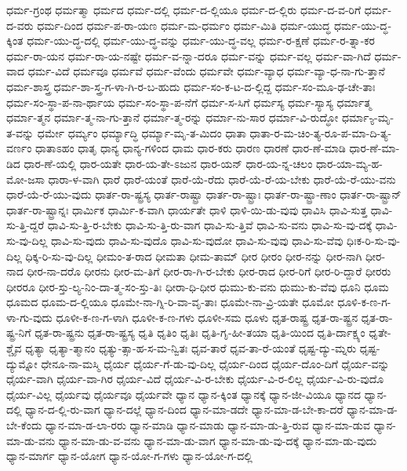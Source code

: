 {ಧರ್ಮ-ಗ್ರಂಥ
ಧರ್ಮತ್ಮಾ
ಧರ್ಮದ
ಧರ್ಮ-ದಲ್ಲಿ
ಧರ್ಮ-ದ-ಲ್ಲಿಯೂ
ಧರ್ಮ-ದ-ಲ್ಲಿರು
ಧರ್ಮ-ದ-ವ-ರಿಗೆ
ಧರ್ಮ-ದ-ವರು
ಧರ್ಮ-ದಿಂದ
ಧರ್ಮ-ಪ-ರಾ-ಯಣ
ಧರ್ಮ-ಮ-ಧರ್ಮಂ
ಧರ್ಮ-ಮಿತಿ
ಧರ್ಮ-ಯುದ್ಧ
ಧರ್ಮ-ಯು-ದ್ಧ-ಕ್ಕಿಂತ
ಧರ್ಮ-ಯು-ದ್ಧ-ದಲ್ಲಿ
ಧರ್ಮ-ಯು-ದ್ಧ-ವನ್ನು
ಧರ್ಮ-ಯು-ದ್ಧ-ವಲ್ಲ
ಧರ್ಮ-ರ-ಕ್ಷಣೆ
ಧರ್ಮ-ರ-ತ್ನಾ-ಕರ
ಧರ್ಮ-ರಾ-ಯನ
ಧರ್ಮ-ರಾ-ಯ-ನಷ್ಟೇ
ಧರ್ಮ-ವ-ನ್ನಾ-ದರೂ
ಧರ್ಮ-ವನ್ನು
ಧರ್ಮ-ವಲ್ಲ
ಧರ್ಮ-ವಾ-ಗಿದೆ
ಧರ್ಮ-ವಾದ
ಧರ್ಮ-ವಿದೆ
ಧರ್ಮವೂ
ಧರ್ಮವೆ
ಧರ್ಮ-ವೆಂದು
ಧರ್ಮವೇ
ಧರ್ಮ-ವ್ಯಾಧ
ಧರ್ಮ-ವ್ಯಾ-ಧ-ನಾ-ಗು-ತ್ತಾನೆ
ಧರ್ಮ-ಶಾಸ್ತ್ರ
ಧರ್ಮ-ಶಾ-ಸ್ತ್ರ-ಗ-ಳಾ-ಗಿ-ರ-ಬ-ಹುದು
ಧರ್ಮ-ಸಂ-ಕ-ಟ-ದ-ಲ್ಲಿದ್ದ
ಧರ್ಮ-ಸಂ-ಮೂ-ಢ-ಚೇ-ತಾಃ
ಧರ್ಮ-ಸಂ-ಸ್ಥಾ-ಪ-ನಾ-ರ್ಥಾಯ
ಧರ್ಮ-ಸಂ-ಸ್ಥಾ-ಪ-ನೆಗೆ
ಧರ್ಮ-ಸ-ಸಿಗೆ
ಧರ್ಮಸ್ಯ
ಧರ್ಮ-ಸ್ಯಾಸ್ಯ
ಧರ್ಮಾತ್ಮ
ಧರ್ಮಾ-ತ್ಮನ
ಧರ್ಮಾ-ತ್ಮ-ನಾ-ಗು-ತ್ತಾನೆ
ಧರ್ಮಾ-ತ್ಮ-ರನ್ನು
ಧರ್ಮಾ-ನು-ಸಾರ
ಧರ್ಮಾ-ವಿ-ರುದ್ಧೋ
ಧರ್ಮಾ-್ಯ-ಮೃ-ತ-ವನ್ನು
ಧರ್ಮೇ
ಧರ್ಮ್ಯಂ
ಧರ್ಮ್ಯಾದ್ಧಿ
ಧರ್ಮ್ಯಾ-ಮೃ-ತ-ಮಿದಂ
ಧಾತಾ
ಧಾತಾ-ರ-ಮ-ಚಿಂ-ತ್ಯ-ರೂ-ಪ-ಮಾ-ದಿ-ತ್ಯ-ವರ್ಣಂ
ಧಾತಾಽಹಂ
ಧಾತೃ
ಧಾನ್ಯ
ಧಾನ್ಯ-ಗಳಿಂದ
ಧಾಮ
ಧಾರ-ಕರು
ಧಾರಣ
ಧಾರಣೆ
ಧಾರ-ಣೆ-ಮಾಡಿ
ಧಾರ-ಣೆ-ಮಾ-ಡಿದ
ಧಾರ-ಣೆ-ಯಲ್ಲಿ
ಧಾರ-ಯತೇ
ಧಾರ-ಯ-ತೇ-ಽಜುನ
ಧಾರ-ಯನ್
ಧಾರ-ಯ-ನ್ನ-ಚಲಂ
ಧಾರ-ಯಾ-ಮ್ಯ-ಹ-ಮೋ-ಜಸಾ
ಧಾರಾ-ಳ-ವಾಗಿ
ಧಾರೆ
ಧಾರೆ-ಯಂತೆ
ಧಾರೆ-ಯೆ-ರೆದು
ಧಾರೆ-ಯೆ-ರೆ-ಯ-ಬೇಕು
ಧಾರೆ-ಯೆ-ರೆ-ಯು-ವನು
ಧಾರೆ-ಯೆ-ರೆ-ಯು-ವುದು
ಧಾರ್ತ-ರಾ-ಷ್ಟ್ರಸ್ಯ
ಧಾರ್ತ-ರಾಷ್ಟ್ರಾ
ಧಾರ್ತ-ರಾ-ಷ್ಟ್ರಾಃ
ಧಾರ್ತ-ರಾ-ಷ್ಟ್ರಾ-ಣಾಂ
ಧಾರ್ತ-ರಾ-ಷ್ಟ್ರಾನ್
ಧಾರ್ತ-ರಾ-ಷ್ಟ್ರಾನ್ನಃ
ಧಾರ್ಮಿಕ
ಧಾರ್ಮಿ-ಕ-ವಾಗಿ
ಧಾರ್ಯತೇ
ಧಾಳಿ
ಧಾಳಿ-ಯಿ-ಡು-ವುವು
ಧಾವಿಸಿ
ಧಾವಿ-ಸುತ್ತ
ಧಾವಿ-ಸು-ತ್ತಿ-ದ್ದರೆ
ಧಾವಿ-ಸು-ತ್ತಿ-ರ-ಬೇಕು
ಧಾವಿ-ಸು-ತ್ತಿ-ರು-ವಾಗ
ಧಾವಿ-ಸು-ತ್ತಿವೆ
ಧಾವಿ-ಸು-ವನು
ಧಾವಿ-ಸು-ವು-ದಕ್ಕೆ
ಧಾವಿ-ಸು-ವು-ದಿಲ್ಲ
ಧಾವಿ-ಸು-ವುದು
ಧಾವಿ-ಸು-ವುದೊ
ಧಾವಿ-ಸು-ವುದೋ
ಧಾವಿ-ಸು-ವುವು
ಧಾವಿ-ಸು-ವೆವು
ಧಿಃಕ-ರಿ-ಸು-ವು-ದಿಲ್ಲ
ಧಿಕ್ಕ-ರಿ-ಸು-ವು-ದಿಲ್ಲ
ಧೀಮಂ-ತ-ರಾದ
ಧೀಮತಾ
ಧೀಮ-ತಾಮ್
ಧೀರ
ಧೀರಂ
ಧೀರ-ನನ್ನು
ಧೀರ-ನಾಗಿ
ಧೀರ-ನಾದ
ಧೀರ-ನಾ-ದರೊ
ಧೀರನು
ಧೀರ-ಮ-ತಿಗೆ
ಧೀರ-ರಾ-ಗಿ-ರ-ಬೇಕು
ಧೀರ-ರಾದ
ಧೀರ-ರಿಗೆ
ಧೀರ-ರಿ-ದ್ದಾರೆ
ಧೀರರು
ಧೀರರೂ
ಧೀರ-ಸ್ತು-ಲ್ಯ-ನಿಂ-ದಾ-ತ್ಮ-ಸಂ-ಸ್ತು-ತಿಃ
ಧೀರಾ-ಧಿ-ಧೀರ
ಧುಮು-ಕು-ವನು
ಧುಮು-ಕು-ವೆವು
ಧೂನಿ
ಧೂಮ
ಧೂಮದ
ಧೂಮ-ದ-ಲ್ಲಿಯೂ
ಧೂಮೇ-ನಾ-ಗ್ನಿ-ರಿ-ವಾ-ವೃ-ತಾಃ
ಧೂಮೇ-ನಾ-ವ್ರಿ-ಯತೇ
ಧೂಮೋ
ಧೂಳಿ-ಕ-ಣ-ಗ-ಳಾ-ಗು-ವುದು
ಧೂಳೀ-ಕ-ಣ-ಗ-ಳಾಗಿ
ಧೂಳೀ-ಕ-ಣ-ಗಳು
ಧೂಳೀ-ಸಮ
ಧೂಳು
ಧೃತ-ರಾಷ್ಟ್ರ
ಧೃತ-ರಾ-ಷ್ಟ್ರನ
ಧೃತ-ರಾ-ಷ್ಟ್ರ-ನಿಗೆ
ಧೃತ-ರಾ-ಷ್ಟ್ರನು
ಧೃತ-ರಾ-ಷ್ಟ್ರಸ್ಯ
ಧೃತಿ
ಧೃತಿಂ
ಧೃತಿಃ
ಧೃತಿ-ಗೃ-ಹೀ-ತಯಾ
ಧೃತಿ-ಯಿಂದ
ಧೃತಿ-ರ್ದಾಕ್ಷ್ಯಂ
ಧೃತೇ-ಶ್ಚೈವ
ಧೃತ್ಯಾ
ಧೃತ್ಯಾ-ತ್ಮಾನಂ
ಧೃತ್ಯು-ತ್ಸಾ-ಹ-ಸ-ಮ-ನ್ವಿತಃ
ಧೃವ-ತಾರೆ
ಧೃವ-ತಾ-ರೆ-ಯಂತೆ
ಧೃಷ್ಟ-ದ್ಯು-ಮ್ನರು
ಧೃಷ್ಟ-ದ್ಯುಮ್ನೋ
ಧೇನೂ-ನಾ-ಮಸ್ಮಿ
ಧೈರ್ಯ
ಧೈರ್ಯ-ಗೆ-ಡು-ವು-ದಿಲ್ಲ
ಧೈರ್ಯ-ದಿಂದ
ಧೈರ್ಯ-ದೊಂ-ದಿಗೆ
ಧೈರ್ಯ-ವನ್ನು
ಧೈರ್ಯ-ವಾಗಿ
ಧೈರ್ಯ-ವಾ-ಗಿರ
ಧೈರ್ಯ-ವಿದೆ
ಧೈರ್ಯ-ವಿ-ರ-ಬೇಕು
ಧೈರ್ಯ-ವಿ-ರ-ಲಿಲ್ಲ
ಧೈರ್ಯ-ವಿ-ರು-ವುದೊ
ಧೈರ್ಯ-ವಿಲ್ಲ
ಧೈರ್ಯವು
ಧೈರ್ಯವೂ
ಧೈರ್ಯವೇ
ಧ್ಯಾನ
ಧ್ಯಾನ-ಕ್ಕಿಂತ
ಧ್ಯಾನಕ್ಕೆ
ಧ್ಯಾನ-ಜೀ-ವಿಯೂ
ಧ್ಯಾನದ
ಧ್ಯಾನ-ದಲ್ಲಿ
ಧ್ಯಾನ-ದ-ಲ್ಲಿ-ರು-ವಾಗ
ಧ್ಯಾನ-ದಲ್ಲೆ
ಧ್ಯಾನ-ದಿಂದ
ಧ್ಯಾನ-ಮಾ-ಡದೇ
ಧ್ಯಾನ-ಮಾ-ಡ-ಬೇ-ಕಾ-ದರೆ
ಧ್ಯಾನ-ಮಾ-ಡ-ಬೇ-ಕೆಂದು
ಧ್ಯಾನ-ಮಾ-ಡ-ಲಾ-ರರು
ಧ್ಯಾನ-ಮಾಡಿ
ಧ್ಯಾನ-ಮಾಡು
ಧ್ಯಾನ-ಮಾ-ಡು-ತ್ತಿ-ರುವ
ಧ್ಯಾನ-ಮಾ-ಡುವ
ಧ್ಯಾನ-ಮಾ-ಡು-ವನು
ಧ್ಯಾನ-ಮಾ-ಡು-ವ-ವನು
ಧ್ಯಾನ-ಮಾ-ಡು-ವಾಗ
ಧ್ಯಾನ-ಮಾ-ಡು-ವು-ದಕ್ಕೆ
ಧ್ಯಾನ-ಮಾ-ಡು-ವುದು
ಧ್ಯಾನ-ಮಾರ್ಗ
ಧ್ಯಾನ-ಯೋಗ
ಧ್ಯಾನ-ಯೋ-ಗ-ಗಳು
ಧ್ಯಾನ-ಯೋ-ಗ-ದಲ್ಲಿ
}
